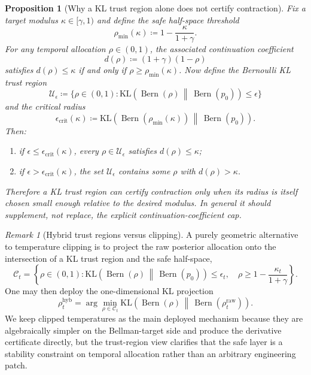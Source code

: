 \documentclass{article}
\newtheorem{proposition}[proposition]{Proposition}
\theoremstyle{remark}
\newtheorem{remark}[remark]{Remark}
\DeclareMathOperator{\Bern}{Bern}
\newcommand{\KL}{\mathrm{KL}}
\newcommand{\defeq}{\coloneqq}
\newcommand{\pprior}{p_0}
\newcommand{\KLbin}[2]{\KL\!\left(\Bern(#1)\,\middle\|\,\Bern(#2)\right)}
\begin{document}
\begin{proposition}[Why a KL trust region alone does not certify contraction]
\label{prop:trust-region-safety}
Fix a target modulus $\kappa\in[\gamma,1)$ and define the safe half-space threshold
\[
\rho_{\min}(\kappa) \defeq 1-\frac{\kappa}{1+\gamma}.
\]
For any temporal allocation $\rho\in(0,1)$, the associated continuation coefficient
\[
d(\rho)\defeq (1+\gamma)(1-\rho)
\]
satisfies $d(\rho)\le \kappa$ if and only if $\rho\ge \rho_{\min}(\kappa)$. Now define the Bernoulli KL trust region
\[
\mathcal U_\epsilon \defeq \{\rho\in(0,1): \KLbin{\rho}{\pprior}\le \epsilon\}
\]
and the critical radius
\[
\epsilon_{\mathrm{crit}}(\kappa)
\defeq
\KLbin{\rho_{\min}(\kappa)}{\pprior}.
\]
Then:
\begin{enumerate}[label=(\roman*)]
    \item if $\epsilon\le \epsilon_{\mathrm{crit}}(\kappa)$, every $\rho\in\mathcal U_\epsilon$ satisfies $d(\rho)\le \kappa$;
    \item if $\epsilon>\epsilon_{\mathrm{crit}}(\kappa)$, the set $\mathcal U_\epsilon$ contains some $\rho$ with $d(\rho)>\kappa$.
\end{enumerate}
Therefore a KL trust region can certify contraction only when its radius is itself chosen small enough relative to the desired modulus. In general it should supplement, not replace, the explicit continuation-coefficient cap.
\end{proposition}

\begin{remark}[Hybrid trust regions versus clipping]
\label{rem:hybrid-trust-region}
A purely geometric alternative to temperature clipping is to project the raw posterior allocation onto the intersection of a KL trust region and the safe half-space,
\[
\mathcal C_t
=
\left\{\rho\in(0,1):
\KLbin{\rho}{\pprior}\le \epsilon_t,
\quad
\rho\ge 1-\frac{\kappa_t}{1+\gamma}
\right\}.
\]
One may then deploy the one-dimensional KL projection
\[
\rho_t^{\mathrm{hyb}}
=
\arg\min_{\rho\in\mathcal C_t}
\KLbin{\rho}{\rho_t^{\mathrm{raw}}}.
\]
We keep clipped temperatures as the main deployed mechanism because they are algebraically simpler on the Bellman-target side and produce the derivative certificate directly, but the trust-region view clarifies that the safe layer is a stability constraint on temporal allocation rather than an arbitrary engineering patch.
\end{remark}
\end{document}
